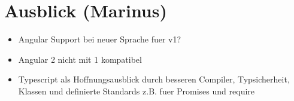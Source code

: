 \chapter{Ausblick (Marinus)}\label{ausblick-marinus}

\begin{itemize}
\itemsep1pt\parskip0pt
\item
  Angular Support bei neuer Sprache fuer v1?
\item
  Angular 2 nicht mit 1 kompatibel
\item
  Typescript als Hoffnungsausblick durch besseren Compiler,
  Typsicherheit, Klassen und definierte Standards z.B. fuer Promises und
  require
\end{itemize}
